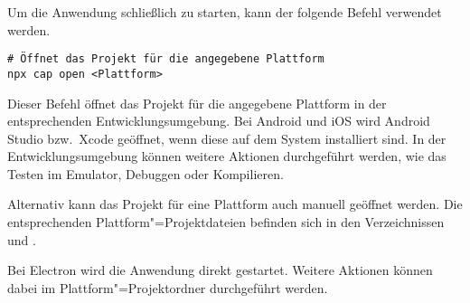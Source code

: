 Um die Anwendung schließlich zu starten, kann der folgende Befehl verwendet werden.

\begin{verbatim}
# Öffnet das Projekt für die angegebene Plattform
npx cap open <Plattform>
\end{verbatim}

Dieser Befehl öffnet das Projekt für die angegebene Plattform in der entsprechenden Entwicklungsumgebung. 
Bei Android und iOS wird Android Studio bzw.\ Xcode geöffnet, wenn diese auf dem System installiert sind.
In der Entwicklungsumgebung können weitere Aktionen durchgeführt werden, wie das Testen im Emulator, Debuggen oder Kompilieren.

Alternativ kann das Projekt für eine Plattform auch manuell geöffnet werden. Die entsprechenden Plattform"=Projektdateien befinden sich in den Verzeichnissen  und .

Bei Electron wird die Anwendung direkt gestartet. Weitere Aktionen können dabei im Plattform"=Projektordner  durchgeführt werden.

